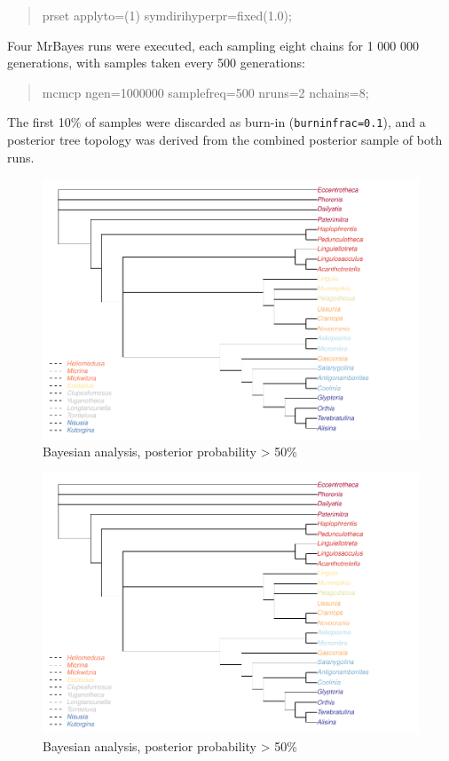 \documentclass[]{book}
\theoremstyle{definition}
\theoremstyle{definition}
\theoremstyle{definition}
\theoremstyle{remark}
\begin{document}
\begin{quote}
prset applyto=(1) symdirihyperpr=fixed(1.0);
\end{quote}

Four MrBayes runs were executed, each sampling eight chains for 1 000
000 generations, with samples taken every 500 generations:

\begin{quote}
mcmcp ngen=1000000 samplefreq=500 nruns=2 nchains=8;
\end{quote}

The first 10\% of samples were discarded as burn-in
(\texttt{burninfrac=0.1}), and a posterior tree topology was derived
from the combined posterior sample of both runs.

\begin{figure}
\centering
\includegraphics{Brachiopod_phylogeny_files/figure-latex/unnamed-chunk-15-1.pdf}
\caption{\label{fig:unnamed-chunk-15}Bayesian analysis, posterior
probability \textgreater{} 50\%}
\end{figure}

\begin{figure}
\centering
\includegraphics{Brachiopod_phylogeny_files/figure-latex/unnamed-chunk-16-1.pdf}
\caption{\label{fig:unnamed-chunk-16}Bayesian analysis, posterior
probability \textgreater{} 50\%}
\end{figure}
\end{document}
